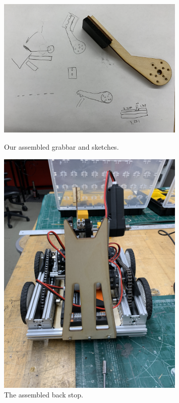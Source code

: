 \begin{figure}[ht]
\centering
\begin{minipage}[b]{.50\textwidth}
  \centering
  \includegraphics[width=0.8\textwidth]{Meetings/October/10-11-21/10-11-21_Hardware_Figure5 - Nathan Forrer.JPG}
  \caption{Our assembled grabbar and sketches.}
  \label{fig:pic5}
\end{minipage}%
\hfill%
\begin{minipage}[b]{.50\textwidth}
  \centering
  \includegraphics[width=0.8\textwidth]{Meetings/October/10-11-21/10-11-21_Hardware_Figure6 - Nathan Forrer.JPG}
  \caption{The assembled back stop.}
  \label{fig:pic6}
\end{minipage}
\end{figure}


